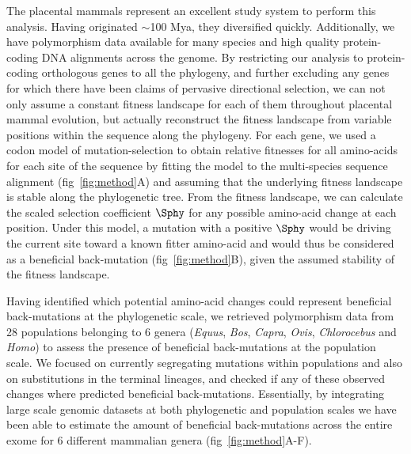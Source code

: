 The placental mammals represent an excellent study system to perform this analysis.
Having originated $\sim$100 Mya\cite{kumar_timetree_2017}, they diversified quickly.
Additionally, we have polymorphism data available for many species\cite{howe_ensembl_2021} and high quality protein-coding DNA alignments across the genome\cite{ranwez_orthomam_2007, scornavacca_orthomam_2019}.
By restricting our analysis to protein-coding orthologous genes to all the phylogeny, and further excluding any genes for which there have been claims of pervasive directional selection, we can not only assume a constant fitness landscape for each of them throughout placental mammal evolution, but actually reconstruct the fitness landscape from variable positions within the sequence along the phylogeny.
For each gene, we used a codon model of mutation-selection\cite{halpern_evolutionary_1998, mccandlish_modeling_2014} to obtain relative fitnesses for all amino-acids for each site of the sequence by fitting the model to the multi-species sequence alignment (fig~\ref{fig:method}A) and assuming that the underlying fitness landscape is stable along the phylogenetic tree.
From the fitness landscape, we can calculate the scaled selection coefficient $\Sphy$ for any possible amino-acid change at each position.
Under this model, a mutation with a positive $\Sphy$ would be driving the current site toward a known fitter amino-acid and would thus be considered as a beneficial back-mutation (fig~\ref{fig:method}B), given the assumed stability of the fitness landscape.

Having identified which potential amino-acid changes could represent beneficial back-mutations at the phylogenetic scale, we retrieved polymorphism data from 28 populations belonging to 6 genera (\textit{Equus}, \textit{Bos}, \textit{Capra}, \textit{Ovis}, \textit{Chlorocebus} and \textit{Homo}) to assess the presence of beneficial back-mutations at the population scale.
We focused on currently segregating mutations within populations and also on substitutions in the terminal lineages, and checked if any of these observed changes where predicted beneficial back-mutations.
Essentially, by integrating large scale genomic datasets at both phylogenetic and population scales we have been able to estimate the amount of beneficial back-mutations across the entire exome for 6 different mammalian genera (fig~\ref{fig:method}A-F).

